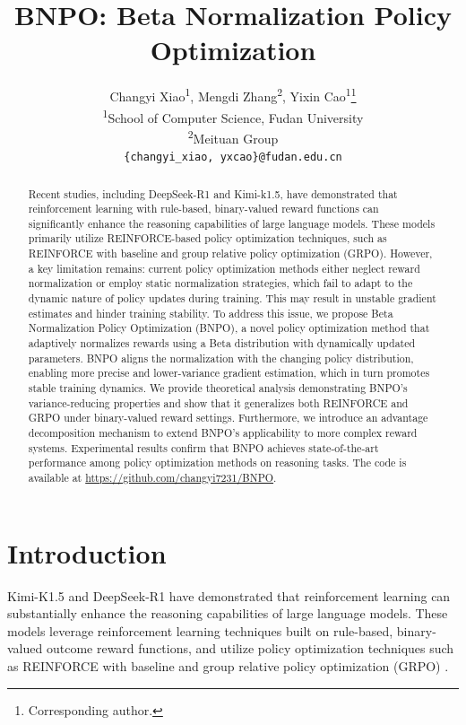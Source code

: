 \documentclass{article}
\title{BNPO: Beta Normalization Policy Optimization}
\author{%
  Changyi Xiao\textsuperscript{\rm 1}, Mengdi Zhang\textsuperscript{\rm 2}, Yixin Cao\textsuperscript{\rm 1}\thanks{Corresponding author.} \\
  \textsuperscript{\rm 1}School of Computer Science, Fudan University\\
    \textsuperscript{\rm 2}Meituan Group\\
  \texttt{\{changyi\_xiao, yxcao\}@fudan.edu.cn}\\
}
\theoremstyle{plain}
\theoremstyle{definition}
\theoremstyle{remark}
\begin{document}
\maketitle


\begin{abstract}
Recent studies, including DeepSeek-R1 and Kimi-k1.5, have demonstrated that reinforcement learning with rule-based, binary-valued reward functions can significantly enhance the reasoning capabilities of large language models. These models primarily utilize REINFORCE-based policy optimization techniques, such as REINFORCE with baseline and group relative policy optimization (GRPO). However, a key limitation remains: current policy optimization methods either neglect reward normalization or employ static normalization strategies, which fail to adapt to the dynamic nature of policy updates during training. This may result in unstable gradient estimates and hinder training stability. To address this issue, we propose Beta Normalization Policy Optimization (BNPO), a novel policy optimization method that adaptively normalizes rewards using a Beta distribution with dynamically updated parameters. BNPO aligns the normalization with the changing policy distribution, enabling more precise and lower-variance gradient estimation, which in turn promotes stable training dynamics. We provide theoretical analysis demonstrating BNPO's variance-reducing properties and show that it generalizes both REINFORCE and GRPO under binary-valued reward settings. Furthermore, we introduce an advantage decomposition mechanism to extend BNPO’s applicability to more complex reward systems. Experimental results confirm that BNPO achieves state-of-the-art performance among policy optimization methods on reasoning tasks. The code is available at \url{https://github.com/changyi7231/BNPO}.
\end{abstract}

\section{Introduction}
Kimi-K1.5 \citep{team2025kimi} and DeepSeek-R1 \citep{guo2025deepseek} have demonstrated that reinforcement learning can substantially enhance the reasoning capabilities of large language models. These models leverage reinforcement learning techniques built on rule-based, binary-valued outcome reward functions, and utilize policy optimization techniques such as REINFORCE with baseline \citep{kool2019buy} and group relative policy optimization (GRPO) \citep{shao2024deepseekmath}.
\end{document}

